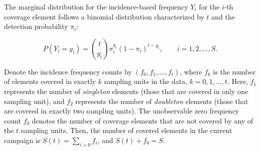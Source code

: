 \documentclass[conference]{IEEEtran}
\begin{document}
The marginal distribution for the incidence-based frequency $Y_i$ for the $i$-th coverage element follows a binomial distribution characterized by $t$ and the detection probability $\pi_i$:

\begin{equation}
    P(Y_i=y_i) = \binom{t}{y_i}\pi_i^{y_i}(1-\pi_i)^{t-y_i}, \qquad i=1,2,\dots,S.
\end{equation}

Denote the incidence frequency counts by $(f_0, f_1, \dots, f_t)$, where $f_k$ is the number of elements covered in exactly $k$ sampling units in the data, $k=0,1,\dots,t$. Here, $f_1$ represents the number of \emph{singleton} elements (those that are covered in only one sampling unit), and $f_2$ represents the number of \emph{doubleton} elements (those that are covered in exactly two sampling units). The unobservable zero frequency count $f_0$ denotes the number of coverage elements that are not covered by any of the $t$ sampling units. Then, the number of covered elements in the current campaign is $S(t)=\sum_{i>0}f_i$, and $S(t)+f_0=S$.

%

%
%
\end{document}
